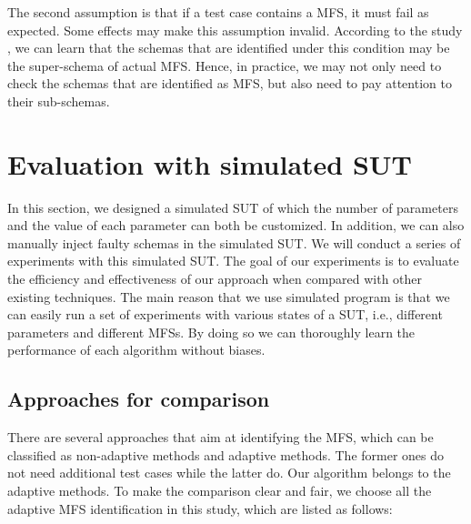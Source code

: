 \documentclass{sig-alternate-05-2015}
\begin{document}
{{The second assumption is that if a test case contains a MFS, it must fail as expected. Some effects \cite{Masri:2014:PCC:2582050.2559932,yilmaz2013reducing} may make this assumption invalid. According to the study \cite{zhang2011characterizing}, we can learn that the schemas that are identified under this condition may be the super-schema of actual MFS. Hence, in practice, we may not only need to check the schemas that are identified as MFS, but also need to pay attention to their sub-schemas.

\section{Evaluation with simulated SUT} \label{sec:simulateEx}
In this section, we designed a simulated SUT of which the number of parameters and the value of each parameter can both be customized. In addition, we can also manually inject faulty schemas in the simulated SUT. We will conduct a series of experiments with this simulated SUT. The goal of our experiments is to evaluate the efficiency and effectiveness of our approach when compared with other existing techniques. The main reason that we use simulated program is that we can easily run a set of experiments with various states of a SUT, i.e., different parameters and different MFSs. By doing so we can thoroughly learn the performance of each algorithm without biases.

\subsection{Approaches for comparison}
There are several approaches that aim at identifying the MFS, which can be classified as non-adaptive methods and adaptive methods. The former ones do not need additional test cases while the latter do. Our algorithm belongs to the adaptive methods. To make the comparison clear and fair, we choose all the adaptive MFS identification in this study, which are listed as follows:

}}
\end{document}
